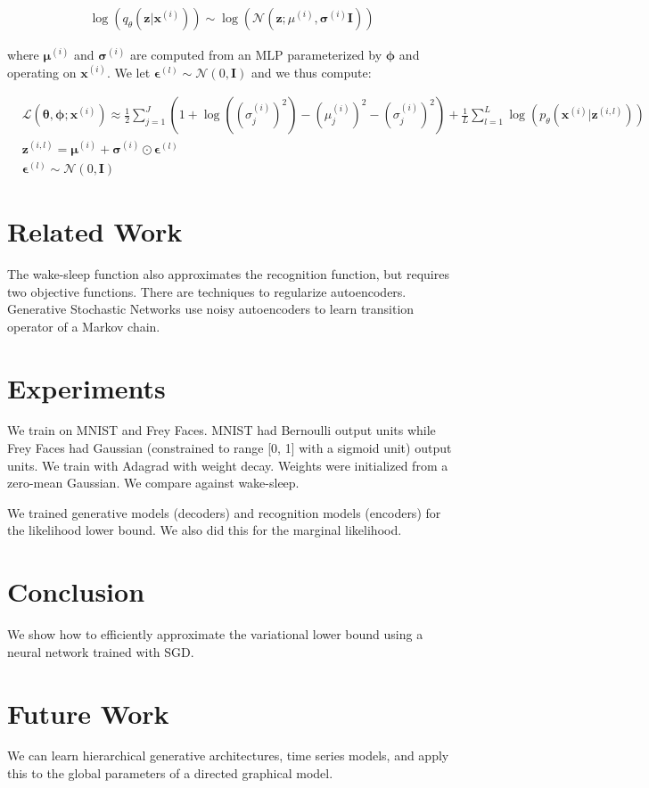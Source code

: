\documentclass[a4paper]{article}
\begin{document}
\begin{align}
  \log(q_{\theta}(\bm{z} | \bm{x}^{(i)}))
  \sim \log(\mathcal{N}(\bm{z}; \mu^{(i)}, \bm{\sigma}^{(i)} \bm{I}))
\end{align}

where $\bm{\mu}^{(i)}$ and $\bm{\sigma}^{(i)}$ are computed from an MLP
parameterized by $\bm{\phi}$ and operating on $\bm{x}^{(i)}$. We let
$\bm{\epsilon}^{(l)} \sim \mathcal{N}(0, \bm{I})$ and we thus compute:

\begin{align}
  & \mathcal{L}(\bm{\theta}, \bm{\phi}; \bm{x}^{(i)})
  \approx \frac{1}{2} \sum_{j=1}^{J}{
    (1 + \log((\sigma_j^{(i)})^2) - (\mu_j^{(i)})^2 - (\sigma_j^{(i)})^2 )
    + \frac{1}{L} \sum_{l=1}^{L}{\log(p_{\theta}(
      \bm{x}^{(i)} | \bm{z}^{(i, l)}
    ))}
    } \\
  & \bm{z}^{(i, l)} = \bm{\mu}^{(i)} + \bm{\sigma}^{(i)} \odot
  \bm{\epsilon}^{(l)} \\
  & \bm{\epsilon}^{(l)} \sim \mathcal{N}(0, \bm{I})
\end{align}

\section{Related Work}
The wake-sleep function also approximates the recognition function, but requires
two objective functions. There are techniques to regularize autoencoders.
Generative Stochastic Networks use noisy autoencoders to learn transition
operator of a Markov chain.

\section{Experiments}
We train on MNIST and Frey Faces. MNIST had Bernoulli output units while
Frey Faces had Gaussian (constrained to range [0, 1] with a sigmoid unit)
output units. We train with Adagrad with weight decay. Weights were initialized
from a zero-mean Gaussian. We compare against wake-sleep.

We trained generative models (decoders) and recognition models (encoders) for
the likelihood lower bound. We also did this for the marginal likelihood.

\section{Conclusion}
We show how to efficiently approximate the variational lower bound using
a neural network trained with SGD.

\section{Future Work}
We can learn hierarchical generative architectures, time series models, 
and apply this to the global parameters of a directed graphical model.
\end{document}
